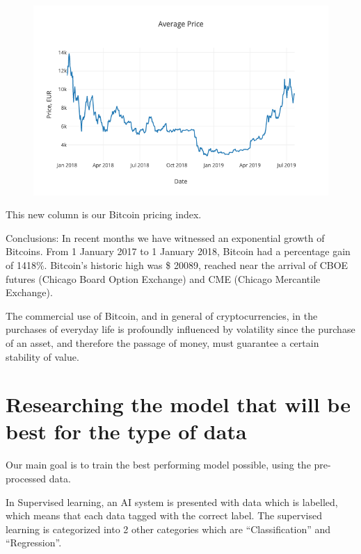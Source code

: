 \documentclass[11pt]{article}
\makeatletter
\def\maxwidth{\ifdim\Gin@nat@width>\linewidth\linewidth
    \else\Gin@nat@width\fi}
\let\Oldincludegraphics\includegraphics
\renewcommand{\includegraphics}[1]{\Oldincludegraphics[width=.8\maxwidth]{#1}}
\makeatother
\begin{document}
\begin{figure}[H]
	\centering
		\includegraphics{6.png}
\end{figure}     
    
    This new column is our Bitcoin pricing index.

    Conclusions: In recent months we have witnessed an exponential growth of
Bitcoins. From 1 January 2017 to 1 January 2018, Bitcoin had a
percentage gain of 1418\%. Bitcoin's historic high was \$ 20089, reached
near the arrival of CBOE futures (Chicago Board Option Exchange) and CME
(Chicago Mercantile Exchange).

    The commercial use of Bitcoin, and in general of cryptocurrencies, in
the purchases of everyday life is profoundly influenced by volatility
since the purchase of an asset, and therefore the passage of money, must
guarantee a certain stability of value.

    \hypertarget{researching-the-model-that-will-be-best-for-the-type-of-data}{%
\section{Researching the model that will be best for the type of
data}\label{researching-the-model-that-will-be-best-for-the-type-of-data}}

    Our main goal is to train the best performing model possible, using the
pre-processed data.

    In Supervised learning, an AI system is presented with data which is
labelled, which means that each data tagged with the correct label. The
supervised learning is categorized into 2 other categories which are
``Classification'' and ``Regression''.
\end{document}
